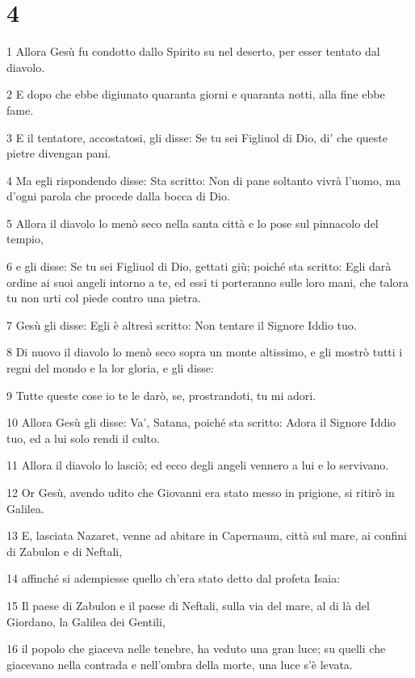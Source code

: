 \chapter{4}

\par 1 Allora Gesù fu condotto dallo Spirito su nel deserto, per esser tentato dal diavolo.
\par 2 E dopo che ebbe digiunato quaranta giorni e quaranta notti, alla fine ebbe fame.
\par 3 E il tentatore, accostatosi, gli disse: Se tu sei Figliuol di Dio, di' che queste pietre divengan pani.
\par 4 Ma egli rispondendo disse: Sta scritto: Non di pane soltanto vivrà l'uomo, ma d'ogni parola che procede dalla bocca di Dio.
\par 5 Allora il diavolo lo menò seco nella santa città e lo pose sul pinnacolo del tempio,
\par 6 e gli disse: Se tu sei Figliuol di Dio, gettati giù; poiché sta scritto: Egli darà ordine ai suoi angeli intorno a te, ed essi ti porteranno sulle loro mani, che talora tu non urti col piede contro una pietra.
\par 7 Gesù gli disse: Egli è altresì scritto: Non tentare il Signore Iddio tuo.
\par 8 Di nuovo il diavolo lo menò seco sopra un monte altissimo, e gli mostrò tutti i regni del mondo e la lor gloria, e gli disse:
\par 9 Tutte queste cose io te le darò, se, prostrandoti, tu mi adori.
\par 10 Allora Gesù gli disse: Va', Satana, poiché sta scritto: Adora il Signore Iddio tuo, ed a lui solo rendi il culto.
\par 11 Allora il diavolo lo lasciò; ed ecco degli angeli vennero a lui e lo servivano.
\par 12 Or Gesù, avendo udito che Giovanni era stato messo in prigione, si ritirò in Galilea.
\par 13 E, lasciata Nazaret, venne ad abitare in Capernaum, città sul mare, ai confini di Zabulon e di Neftali,
\par 14 affinché si adempiesse quello ch'era stato detto dal profeta Isaia:
\par 15 Il paese di Zabulon e il paese di Neftali, sulla via del mare, al di là del Giordano, la Galilea dei Gentili,
\par 16 il popolo che giaceva nelle tenebre, ha veduto una gran luce; su quelli che giacevano nella contrada e nell'ombra della morte, una luce s'è levata.
